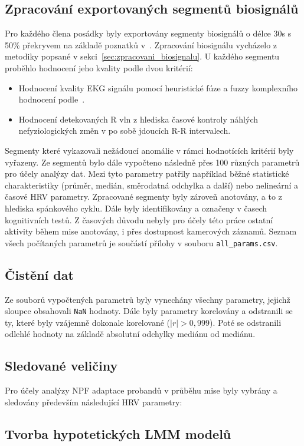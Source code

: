 \subsection{Zpracování exportovaných segmentů biosignálů}
\label{subsec:prezpracovani_segmentu}
Pro každého člena posádky byly exportovány segmenty biosignálů o délce 30s s
50\% překryvem na základě poznatků
v~\cite{Castaldo2019,Kim2021,Pecchia2018,Shaffer2020,Tervonen2021}. Zpracování
biosignálu vycházelo z metodiky popsané v sekci~\ref{sec:zpracovani_biosignalu}.
U každého segmentu proběhlo hodnocení jeho kvality podle dvou kritérií:
\begin{itemize}
    \item Hodnocení kvality \gls{EKG} signálu pomocí heuristické fúze a fuzzy
    komplexního hodnocení podle~\cite{Zhao2018}.
    \item Hodnocení detekovaných R vln z hlediska časové kontroly náhlých
    nefyziologických změn v po sobě jdoucích R-R intervalech.
\end{itemize}
Segmenty které vykazovali nežádoucí anomálie v rámci hodnotících kritérií byly
vyřazeny. Ze segmentů bylo dále vypočteno následně přes 100 různých parametrů
pro účely analýzy dat. Mezi tyto parametry patřily například běžné statistické
charakteristiky (průměr, medián, směrodatná odchylka a další) nebo nelineární a
časové \gls{HRV} parametry. Zpracované segmenty byly zároveň anotovány, a to z
hlediska spánkového cyklu. Dále byly identifikovány a označeny v časech
kognitivních testů. Z časových důvodu nebyly pro účely této práce ostatní
aktivity během mise anotovány, i přes dostupnost kamerových záznamů. Seznam
všech počítaných parametrů je součástí přílohy v souboru
\texttt{all\_params.csv}.

\subsection{Čistění dat}
\label{subsec:cisteni_dat}
Ze souborů vypočtených parametrů byly vynechány všechny parametry, jejichž
sloupce obsahovali \texttt{NaN} hodnoty. Dále byly parametry korelovány a
odstranili se ty, které byly vzájemně dokonale korelované ($|r| > 0,999$). Poté
se odstranili odlehlé hodnoty na základě absolutní odchylky mediánu od mediánu.

\subsection{Sledované veličiny}
\label{subsec:sledovane_veliciny}
Pro účely analýzy \gls{NPF} adaptace probandů v průběhu mise byly vybrány a
sledovány především následující \gls{HRV} parametry:

\subsection{Tvorba hypotetických LMM modelů}
\label{subsec:tvorba_modelů}

